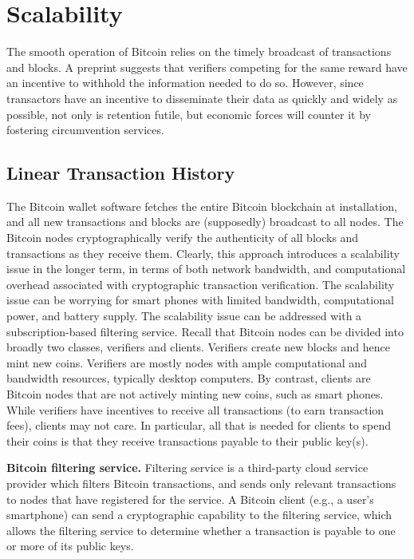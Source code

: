 \section{Scalability}
The smooth operation of Bitcoin relies on the timely broadcast of transactions and
blocks. A preprint  suggests that verifiers competing for the same reward have an
incentive to withhold the information needed to do so. However, since transactors have
an incentive to disseminate their data as quickly and widely as possible, not only is retention
futile, but economic forces will counter it by fostering circumvention services.

\subsection{Linear Transaction History}
The Bitcoin wallet software fetches the entire Bitcoin blockchain at installation,
and all new transactions and blocks are (supposedly) broadcast to all nodes.
The Bitcoin nodes cryptographically verify the authenticity of all blocks and transactions
as they receive them. Clearly, this approach introduces a scalability issue in the
longer term, in terms of both network bandwidth, and computational overhead associated
with cryptographic transaction verification. The scalability issue can be worrying
for smart phones with limited bandwidth, computational power, and battery supply.
The scalability issue can be addressed with a subscription-based filtering service.
Recall that Bitcoin nodes can be divided into broadly two classes, verifiers and clients.
Verifiers create new blocks and hence mint new coins. Verifiers are mostly nodes with
ample computational and bandwidth resources, typically desktop computers. By contrast,
clients are Bitcoin nodes that are not actively minting new coins, such as smart
phones. While verifiers have incentives to receive all transactions (to earn transaction
fees), clients may not care. In particular, all that is needed for clients to spend their
coins is that they receive transactions payable to their public key(s).

\textbf{Bitcoin filtering service.} Filtering service is a third-party cloud service provider
which filters Bitcoin transactions, and sends only relevant transactions to nodes that
have registered for the service. A Bitcoin client (e.g., a user’s smartphone) can send
a cryptographic capability to the filtering service, which allows the filtering service to
determine whether a transaction is payable to one or more of its public keys.

